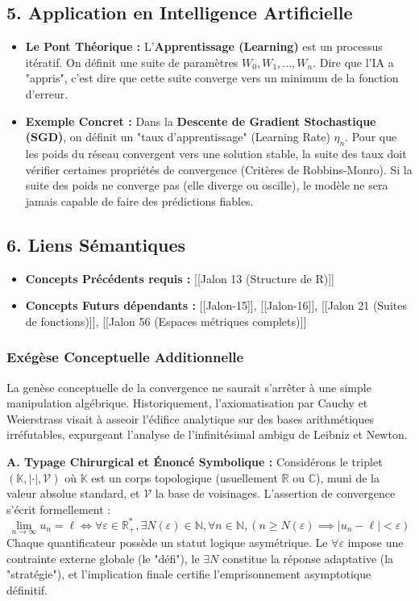 \documentclass[a4paper,11pt]{report}
\begin{document}
\subsection*{5. Application en Intelligence Artificielle}
\begin{itemize}
\item \textbf{Le Pont Théorique :} L'\textbf{Apprentissage (Learning)} est un processus itératif. On définit une suite de paramètres $W_0, W_1, ..., W_n$. Dire que l'IA a "appris", c'est dire que cette suite converge vers un minimum de la fonction d'erreur.

\item \textbf{Exemple Concret :} Dans la \textbf{Descente de Gradient Stochastique (SGD)}, on définit un "taux d'apprentissage" (Learning Rate) $\eta_n$. Pour que les poids du réseau convergent vers une solution stable, la suite des taux doit vérifier certaines propriétés de convergence (Critères de Robbins-Monro). Si la suite des poids ne converge pas (elle diverge ou oscille), le modèle ne sera jamais capable de faire des prédictions fiables.
\end{itemize}

\subsection*{6. Liens Sémantiques}
\begin{itemize}
\item \textbf{Concepts Précédents requis :} [[Jalon 13 (Structure de R)]]

\item \textbf{Concepts Futurs dépendants :} [[Jalon-15]], [[Jalon-16]], [[Jalon 21 (Suites de fonctions)]], [[Jalon 56 (Espaces métriques complets)]]
\end{itemize}

\subsubsection*{Exégèse Conceptuelle Additionnelle}

La genèse conceptuelle de la convergence ne saurait s'arrêter à une simple manipulation algébrique. Historiquement, l'axiomatisation par Cauchy et Weierstrass visait à asseoir l'édifice analytique sur des bases arithmétiques irréfutables, expurgeant l'analyse de l'infinitésimal ambigu de Leibniz et Newton.

\textbf{A. Typage Chirurgical et Énoncé Symbolique :}
Considérons le triplet $(\mathbb{K}, |\cdot|, \mathcal{V})$ où $\mathbb{K}$ est un corps topologique (usuellement $\mathbb{R}$ ou $\mathbb{C}$), muni de la valeur absolue standard, et $\mathcal{V}$ la base de voisinages. L'assertion de convergence s'écrit formellement :
$$\lim_{n \to \infty} u_n = \ell \iff \forall \varepsilon \in \mathbb{R}_+^*, \exists N(\varepsilon) \in \mathbb{N}, \forall n \in \mathbb{N}, (n \ge N(\varepsilon) \implies |u_n - \ell| < \varepsilon)$$
Chaque quantificateur possède un statut logique asymétrique. Le $\forall \varepsilon$ impose une contrainte externe globale (le "défi"), le $\exists N$ constitue la réponse adaptative (la "stratégie"), et l'implication finale certifie l'emprisonnement asymptotique définitif.
\end{document}
